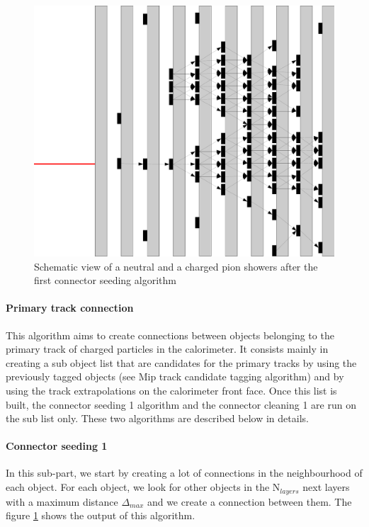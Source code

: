 \documentclass[cits]{JINST}
\begin{document}
\begin{figure}
  \begin{center}
    \includegraphics[width=\linewidth]{ConnectorSeeding1.pdf}
  \end{center}
  \vspace{10pt}
  \caption{\label{ARBOR_CONNECTOR_SEEDING_1} Schematic view of a neutral and a charged pion showers after the first connector seeding algorithm}
\end{figure}

\paragraph*{Primary track connection} This algorithm aims to create connections between objects belonging to the primary track of charged particles in the calorimeter. It consists mainly in creating a sub object list that are candidates for the primary tracks by using the previously tagged objects (see Mip track candidate tagging algorithm) and by using the track extrapolations on the calorimeter front face. Once this list is built, the connector seeding 1 algorithm and the connector cleaning 1 are run on the sub list only. These two algorithms are described below in details.

\paragraph*{Connector seeding 1} In this sub-part, we start by creating a lot of connections in the neighbourhood of each object. For each object, we look for other objects in the N$_{layers}$ next layers with a maximum distance $\Delta_{max}$ and we create a connection between them. The figure \ref{ARBOR_CONNECTOR_SEEDING_1} shows the output of this algorithm.
\end{document}
